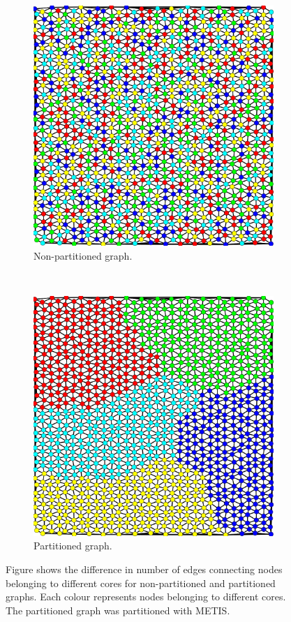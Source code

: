 \begin{figure}
\centering
\begin{subfigure}[b]{0.48\textwidth}
\includegraphics[width=\textwidth]{img/partitioning_false.png}
\caption{Non-partitioned graph.}
\end{subfigure}
~
\begin{subfigure}[b]{0.48\textwidth}
\includegraphics[width=\textwidth]{img/partitioning_true.png}
\caption{Partitioned graph.}
\end{subfigure}
\caption{Figure shows the difference in number of edges connecting nodes belonging to different cores for non-partitioned and partitioned graphs. Each colour represents nodes belonging to different cores. The partitioned graph was partitioned with METIS.}
\label{fig:partitioning}
\end{figure}

